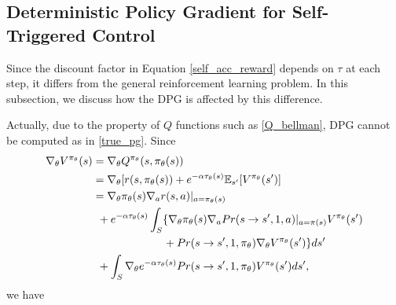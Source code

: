 \documentclass[english, dvipdfmx]{ampmt}             %
\newcommand{\expect}{\mathbb{E}}
\begin{document}
\subsection{Deterministic Policy Gradient for Self-Triggered Control}
Since the discount factor in Equation \eqref{self_acc_reward} depends on $\tau$ at each step, it differs from the general reinforcement learning problem. In this subsection, we discuss how the DPG is affected by this difference. \par
Actually, due to the property of $Q$ functions such as \eqref{Q_bellman}, DPG cannot be computed as in \eqref{true_pg}. Since 
\begin{align}
	\nabla_{\theta}V^{\pi_{\theta}}(s) &= \nabla_{\theta}Q^{\pi_{\theta}}(s, \pi_{\theta}(s)) \nonumber \\
	&= \nabla_{\theta}[r(s, \pi_{\theta}(s)) + e^{-\alpha\tau_{\theta}(s)}\expect_{s^{\prime}}[V^{\pi_{\theta}}(s^{\prime})] \nonumber \\
	&= \nabla_{\theta}\pi_{\theta}(s)\nabla_ar(s,a)|_{a=\pi_{\theta}(s)} \nonumber \\
	&\hspace{1ex}+e^{-\alpha\tau_{\theta}(s)}\int_{S}\{\nabla_{\theta}\pi_{\theta}(s)\nabla_aPr(s\to s^{\prime},1,a)|_{a=\pi(s)}V^{\pi_{\theta}}(s^{\prime})\nonumber\\
	&\hspace{15ex}+Pr(s\to s^{\prime}, 1, \pi_{\theta})\nabla_{\theta}V^{\pi_{\theta}}(s^{\prime})\}ds^{\prime}\nonumber \\
	&\hspace{1ex}+\int_{S}\nabla_{\theta}e^{-\alpha\tau_{\theta}(s)}Pr(s\to s^{\prime}, 1, \pi_{\theta})V^{\pi_{\theta}}(s^{\prime})ds^{\prime},
\end{align}
we have
\end{document}
